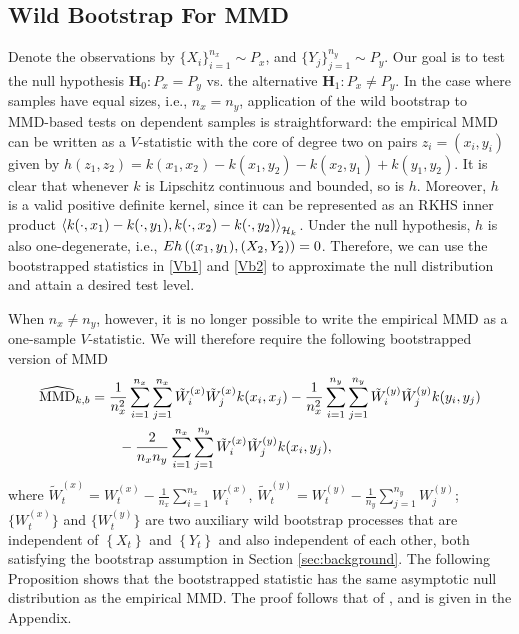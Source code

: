 \subsection{Wild Bootstrap For MMD}
Denote the observations by $\{X_i\}_{i=1}^{n_x}\sim P_x$, and $\{Y_j\}_{j=1}^{n_y}\sim P_y$. Our goal is to test the null hypothesis $\mathbf H_0: P_x=P_y$ vs. 
the alternative $\mathbf H_1: P_x\neq P_y$. In the case where samples have equal sizes, i.e., $n_x=n_y$, application of the wild bootstrap to MMD-based tests on dependent samples is straightforward: the empirical MMD can be written as a $V$-statistic with the core of degree two on pairs $z_i=(x_i,y_i)$ given by $h(z_1,z_2) = k(x_1,x_2)- k(x_1,y_2) - k(x_2,y_1) + k(y_1,y_2)$. It is clear that whenever $k$ is Lipschitz continuous and bounded, so is $h$. Moreover, $h$ is a valid positive definite kernel, since it can be represented as an RKHS inner product  $\left\langle k(\cdot, x_1) -k(\cdot, y_1),k(\cdot, x_2) -k(\cdot, y_2) \right\rangle_{\mathcal{H}_k}$. Under the null hypothesis, $h$ is also one-degenerate, i.e., $E h\left((x_1,y_1),(X_2,Y_2)\right) = 0$. Therefore, we can use the bootstrapped statistics in \eqref{Vb1} and \eqref{Vb2} to approximate the null distribution and attain a desired test level.

When $n_x\neq n_y$, however, it is no longer possible to write the empirical MMD
as a one-sample $V$-statistic. We will therefore require the following bootstrapped version of MMD
\begin{align}
\widehat{\text{MMD}}_{k,b}&=\frac{1}{n_x^2}\sum_{i=1}^{n_x}\sum_{j=1}^{n_x}\tilde W_i^{(x)}\tilde W_j^{(x)}k(x_i,x_j)-\frac{1}{n_x^2}\sum_{i=1}^{n_y}\sum_{j=1}^{n_y}\tilde W_i^{(y)}\tilde W_j^{(y)}k(y_i,y_j)\notag\\
{}&\qquad-\frac{2}{n_x n_y}\sum_{i=1}^{n_x}\sum_{j=1}^{n_y}\tilde W_i^{(x)}\tilde W_j^{(y)}k(x_i,y_j),\label{eq:mmdkb}
\end{align}
where $\tilde W_t^{(x)}=W_t^{(x)}-\frac{1}{n_x}\sum_{i=1}^{n_x}W_i^{(x)}$, $\tilde W_t^{(y)}=W_t^{(y)}-\frac{1}{n_y}\sum_{j=1}^{n_y}W_j^{(y)}$;  $\{W_t^{(x)}\}$ and $\{W_t^{(y)}\}$ are two auxiliary wild bootstrap processes that are independent of $\left\{ X_t \right\}$ and $\left\{ Y_t \right\}$ and also independent of each other, both satisfying the bootstrap assumption in Section \ref{sec:background}.  
The following Proposition shows that the bootstrapped statistic has the same asymptotic null distribution as the empirical MMD. The proof follows that of \cite[Theorem 3.1]{leucht_dependent_2013}, and is given in the Appendix.


